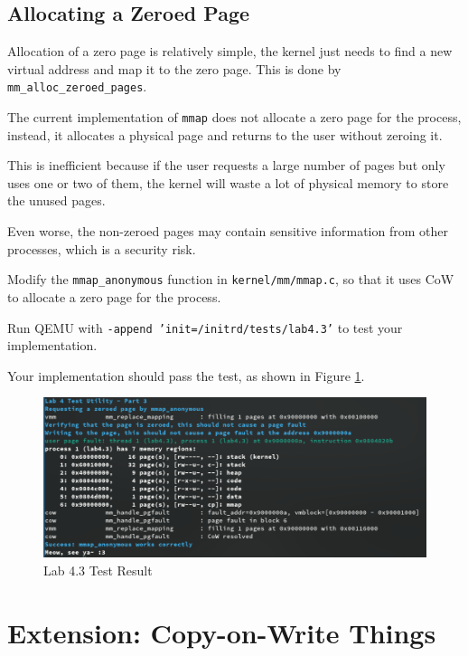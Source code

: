 \subsection{Allocating a Zeroed Page}

Allocation of a zero page is relatively simple, the kernel just needs to
find a new virtual address and map it to the zero page. This is done by
\texttt{mm\_alloc\_zeroed\_pages}.

The current implementation of \texttt{mmap} does not allocate a zero page
for the process, instead, it allocates a physical page and returns to
the user without zeroing it.

This is inefficient because if the user requests a large number of pages but
only uses one or two of them, the kernel will waste a lot of physical memory
to store the unused pages.

Even worse, the non-zeroed pages may contain sensitive information from
other processes, which is a security risk.

\begin{exercise}
    \item Modify the \texttt{mmap\_anonymous} function in \texttt{kernel/mm/mmap.c},
    so that it uses CoW to allocate a zero page for the process.
    \item Run QEMU with \texttt{-append 'init=/initrd/tests/lab4.3'} to test your
    implementation.

    Your implementation should pass the test, as shown in Figure \ref{fig:lab4.3}.

    \begin{figure}[H]
        \centering
        \includegraphics[width=0.8\linewidth]{assets/c4.mmap.png}
        \caption{Lab 4.3 Test Result}
        \label{fig:lab4.3}
    \end{figure}
\end{exercise}

\section{Extension: Copy-on-Write Things}

